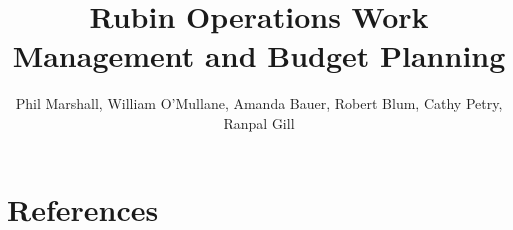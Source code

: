 \documentclass[DM,authoryear,toc]{lsstdoc}
\title{Rubin Operations Work Management and Budget Planning}
\author{%
Phil Marshall, William O'Mullane, Amanda Bauer, Robert Blum, Cathy Petry, Ranpal Gill
}
\date{\vcsDate}
\begin{document}
\maketitle



\appendix

\section{References} \label{sec:bib}
\renewcommand{\refname}{} %


%
\printglossaries


\end{document}
